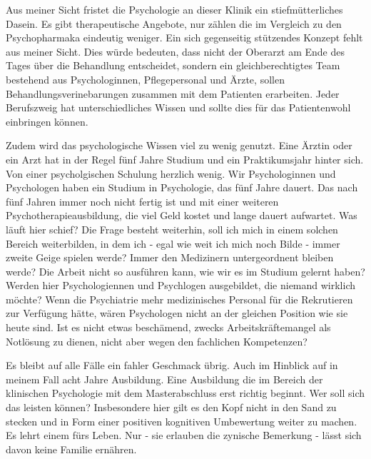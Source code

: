 Aus meiner Sicht fristet die Psychologie an dieser Klinik ein stiefmütterliches Dasein. Es gibt therapeutische Angebote, nur zählen die im Vergleich zu den Psychopharmaka eindeutig weniger. Ein sich gegenseitig stützendes Konzept fehlt aus meiner Sicht. Dies würde bedeuten, dass nicht der Oberarzt am Ende des Tages über die Behandlung entscheidet, sondern ein gleichberechtigtes Team bestehend aus Psychologinnen, Pflegepersonal und Ärzte, sollen Behandlungsverinebarungen zusammen mit dem Patienten erarbeiten. Jeder Berufszweig hat unterschiedliches Wissen und sollte dies für das Patientenwohl einbringen können. 

Zudem wird das psychologische Wissen viel zu wenig genutzt. Eine Ärztin oder ein Arzt hat in der Regel fünf Jahre Studium und ein Praktikumsjahr hinter sich. Von einer psycholgischen Schulung herzlich wenig. Wir Psychologinnen und Psychologen haben ein Studium in Psychologie, das fünf Jahre dauert. Das nach fünf Jahren immer noch nicht fertig ist und mit einer weiteren Psychotherapieausbildung, die viel Geld kostet und lange dauert aufwartet. Was läuft hier schief? Die Frage besteht weiterhin, soll ich mich in einem solchen Bereich weiterbilden, in dem ich - egal wie weit ich mich noch Bilde - immer zweite Geige spielen werde? Immer den Medizinern untergeordnent bleiben werde? Die Arbeit nicht so ausführen kann, wie wir es im Studium gelernt haben? Werden hier Psychologiennen und Psychlogen ausgebildet, die niemand wirklich möchte? Wenn die Psychiatrie mehr medizinisches Personal für die Rekrutieren zur Verfügung hätte, wären Psychologen nicht an der gleichen Position wie sie heute sind. Ist es nicht etwas beschämend, zwecks Arbeitskräftemangel als Notlösung zu dienen, nicht aber wegen den fachlichen Kompetenzen? 

Es bleibt auf alle Fälle ein fahler Geschmack übrig. Auch im Hinblick auf in meinem Fall acht Jahre Ausbildung. Eine Ausbildung die im Bereich der klinischen Psychologie mit dem Masterabschluss erst richtig beginnt. Wer soll sich das leisten können? Insbesondere hier gilt es den Kopf nicht in den Sand zu stecken und in Form einer positiven kognitiven Umbewertung weiter zu machen. Es lehrt einem fürs Leben. Nur - sie erlauben die zynische Bemerkung - lässt sich davon keine Familie ernähren.  

